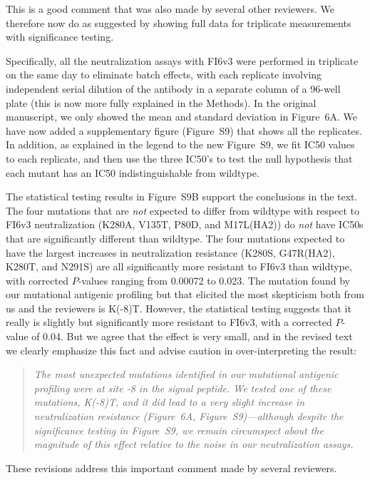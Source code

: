 \documentclass[11pt, oneside]{article}   	%
\begin{document}
{\color{black}
This is a good comment that was also made by several other reviewers.
We therefore now do as suggested by showing full data for triplicate measurements with significance testing.

Specifically, all the neutralization assays with FI6v3 were performed in triplicate on the same day to eliminate batch effects, with each replicate involving independent serial dilution of the antibody in a separate column of a 96-well plate (this is now more fully explained in the Methods).
In the original manuscript, we only showed the mean and standard deviation in Figure~6A.
We have now added a supplementary figure (Figure~S9) that shows all the replicates.
In addition, as explained in the legend to the new Figure~S9, we fit IC50 values to each replicate, and then use the three IC50's to test the null hypothesis that each mutant has an IC50 indistinguishable from wildtype.

The statistical testing results in Figure~S9B support the conclusions in the text. 
The four mutations that are \emph{not} expected to differ from wildtype with respect to FI6v3 neutralization (K280A, V135T, P80D, and M17L(HA2)) do \emph{not} have IC50s that are significantly different than wildtype.
The four mutations expected to have the largest increases in neutralization resistance (K280S, G47R(HA2), K280T, and N291S) are all significantly more resistant to FI6v3 than wildtype, with corrected $P$-values ranging from 0.00072 to 0.023.
The mutation found by our mutational antigenic profiling but that elicited the most skepticism both from us and the reviewers is K(-8)T.
However, the statistical testing suggests that it really is slightly but significantly more resistant to FI6v3, with a corrected $P$-value of 0.04. 
But we agree that the effect is very small, and in the revised text we clearly emphasize this fact and advise caution in over-interpreting the result:

\begin{quote}
\textsl{The most unexpected mutations identified in our mutational antigenic profiling were at site -8 in the signal peptide.
We tested one of these mutations, K(-8)T, and it did lead to a very slight increase in neutralization resistance (Figure~6A, Figure~S9)---although despite the significance testing in Figure~S9, we remain circumspect about the magnitude of this effect relative to the noise in our neutralization assays.
}
\end{quote}

These revisions address this important comment made by several reviewers.
}
\end{document}
